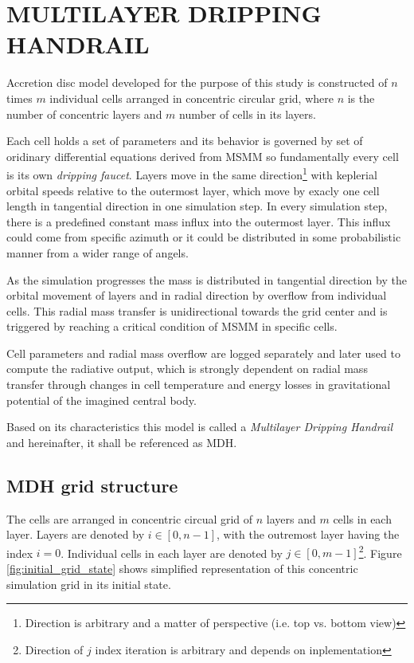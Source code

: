 \chapter{MULTILAYER DRIPPING HANDRAIL}
\thispagestyle{empty}

Accretion disc model developed for the purpose of this study is constructed of $n$ times $m$ individual cells arranged in concentric circular grid, where $n$ is the number of concentric layers and $m$ number of cells in its layers. 

Each cell holds a set of parameters and its behavior is governed by set of oridinary differential equations derived from MSMM so fundamentally every cell is its own \emph{dripping faucet}. Layers move in the same direction\footnote{Direction is arbitrary and a matter of perspective (i.e. top vs. bottom view)} with keplerial orbital speeds relative to the outermost layer, which move by exacly one cell length in tangential direction in one simulation step. In every simulation step, there is a predefined constant mass influx into the outermost layer. This influx could come from specific azimuth or it could be distributed in some probabilistic manner from a wider range of angels.

As the simulation progresses the mass is distributed in tangential direction by the orbital movement of layers and in radial direction by overflow from individual cells. This radial mass transfer is unidirectional towards the grid center and is triggered by reaching a critical condition of MSMM in specific cells. 

Cell parameters and radial mass overflow are logged separately and later used to compute the radiative output, which is strongly dependent on radial mass transfer through changes in cell temperature and energy losses in gravitational potential of the imagined central body. 

Based on its characteristics this model is called a \emph{Multilayer Dripping Handrail} and hereinafter, it shall be referenced as MDH.

\section{MDH grid structure}

The cells are arranged in concentric circual grid of $n$ layers and $m$ cells in each layer. Layers are denoted by $i \in [0, n-1]$, with the outremost layer having the index $i = 0$. Individual cells in each layer are denoted by $j \in [0, m-1]$\footnote{Direction of $j$ index iteration is arbitrary and depends on inplementation}. Figure \ref{fig:initial_grid_state} shows simplified representation of this concentric simulation grid in its initial state. 

